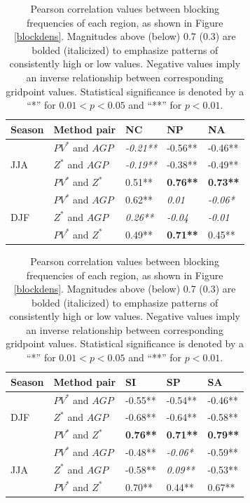 \documentclass[smallextended]{svjour3}       %
\numberwithin{equation}{section}
\begin{document}
\begin{table}
\centering
\caption{Pearson correlation values between blocking frequencies of each region, as shown in Figure \ref{blockdens}. Magnitudes above (below) 0.7 (0.3) are bolded (italicized) to emphasize patterns of consistently high or low values. Negative values imply an inverse relationship between corresponding gridpoint values. Statistical significance is denoted by a ``*'' for $0.01<p<0.05$ and ``**'' for $p<0.01$.}
\label{pearsontabcol}
\begin{tabular}{|l|l|l|l|l|}
\hline
 Season & Method pair & NC    & NP    & NA   \\ \hline
\multirow{3}{*}{JJA} 
   & $PV^* $ and $AGP$  & \textit{-0.21**} & -0.56** & -0.46** \\ 
   & $Z^*$ and $AGP$  & \textit{-0.19**} & -0.38** & -0.49** \\  
   & $PV^*$ and $Z^*$  & 0.51** & \textbf{0.76**} & \textbf{0.73**} \\ 
   \hline
\multirow{3}{*}{DJF}
  & $PV^*$ and $AGP$ & 0.62** & \textit{0.01} &\textit{ -0.06*} \\  
  & $Z^*$ and $AGP$  & \textit{0.26**}& \textit{-0.04}& \textit{-0.01}  \\ 
  & $PV^*$ and $Z^*$  & 0.49** & \textbf{0.71**} & 0.45**  \\   \hline
\end{tabular}
\begin{tabular}{|l|l|l|l|l|}
\hline
 Season & Method pair &  SI    & SP    & SA    \\ \hline

\multirow{3}{*}{DJF}
  & $PV^*$ and $AGP$  & -0.55**&-0.54** & -0.46**\\  
  & $Z^*$ and $AGP$   & -0.68**& -0.64** & -0.58**\\ 
  & $PV^*$ and $Z^*$  & \textbf{0.76**} & \textbf{0.71**} & \textbf{0.79**} \\   \hline
  
  \multirow{3}{*}{JJA} 
   & $PV^* $ and $AGP$  & -0.48** & \textit{-0.06*} & -0.59**\\ 
   & $Z^*$ and $AGP$  & -0.58** & \textit{0.09**} & {-0.53**} \\  
   & $PV^*$ and $Z^*$  & {0.70**} & {0.44**} & {0.67**} \\ 
   \hline
\end{tabular}
\end{table}
\end{document}
